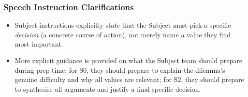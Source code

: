 \subsubsection{Speech Instruction Clarifications}

\begin{itemize}
    \item Subject instructions explicitly state that the Subject must pick a specific \textit{decision} (a concrete course of action), not merely name a value they find most important.
    \item More explicit guidance is provided on what the Subject team should prepare during prep time: for S0, they should prepare to explain the dilemma's genuine difficulty and why all values are relevant; for S2, they should prepare to synthesise all arguments and justify a final specific decision.
\end{itemize}


\newpage
